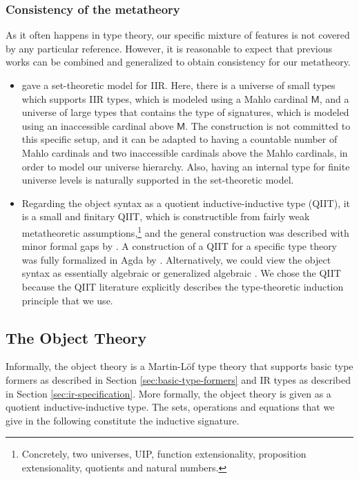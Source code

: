 \documentclass[acmsmall,screen,review]{acmart}
\newcommand{\msf}[1]{{\mathsf{#1}}}
\begin{document}
\subsubsection{Consistency of the metatheory} As it often happens in type theory, our specific mixture
of features is not covered by any particular reference. However, it is reasonable to expect that
previous works can be combined and generalized to obtain consistency for our metatheory.
\begin{itemize}
\item \citet{DBLP:journals/jlp/DybjerS06} gave a set-theoretic model for IIR. Here, there is a
  universe of small types which supports IIR types, which is modeled using a Mahlo cardinal
  $\msf{M}$, and a universe of large types that contains the type of signatures, which is modeled
  using an inaccessible cardinal above $\msf{M}$. The construction is not committed to this specific
  setup, and it can be adapted to having a countable number of Mahlo cardinals and two inaccessible
  cardinals above the Mahlo cardinals, in order to model our universe hierarchy. Also, having an
  internal type for finite universe levels is naturally supported in the set-theoretic model.
\item Regarding the object syntax as a quotient inductive-inductive type (QIIT), it is a small and
  finitary QIIT, which is constructible from fairly weak metatheoretic
  assumptions,\footnote{Concretely, two universes, UIP, function extensionality, proposition
  extensionality, quotients and natural numbers.} and the general construction was described with
  minor formal gaps by \citet{DBLP:journals/corr/abs-2302-08837}. A construction of a QIIT for a
  specific type theory was fully formalized in Agda by \citet{initiality-agda}. Alternatively, we
  could view the object syntax as essentially algebraic \cite{partialhorn} or generalized algebraic
  \cite{cartmellthesis}. We chose the QIIT because the QIIT literature explicitly describes the
  type-theoretic induction principle that we use.
\end{itemize}

\subsection{The Object Theory}\label{sec:object-theory}

Informally, the object theory is a Martin-Löf type theory that supports basic type formers as
described in Section \ref{sec:basic-type-formers} and IR types as described in Section
\ref{sec:ir-specification}. More formally, the object theory is given as a quotient
inductive-inductive type. The sets, operations and equations that we give in the following
constitute the inductive signature.
\end{document}
